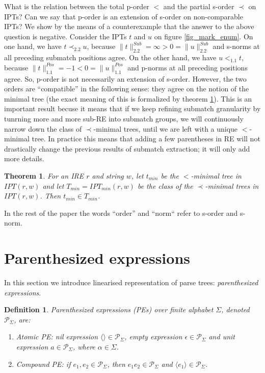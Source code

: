 \documentclass[AMA,STIX1COL]{WileyNJD-v2}
\newcommand{\Xl}{\langle}
\newcommand{\Xr}{\rangle}
\newcommand{\Xm}{\langle\!\rangle}
\newcommand{\XP}{\mathcal{P}}
\newcommand{\IPT}{I\!PT}
\newcommand{\pnorm}[2]{\|{#1}\|^{Pos}_{#2}}
\newcommand{\snorm}[2]{\|{#1}\|^{Sub}_{#2}}
\newtheorem{Xdef}{Definition}
\newtheorem{XThe}{Theorem}
\begin{document}
What is the relation between the total p-order $<$ and the partial s-order $\prec$ on IPTs?
Can we say that p-order is an extension of s-order on non-comparable IPTs?
We show by the means of a counterexample that the answer to the above question is negative.
Consider the IPTs $t$ and $u$ on figure \ref{fig_mark_enum}.
On one hand, we have $t \prec_{2.2} u$, because $\snorm{t}{2.2} = \infty > 0 = \snorm{u}{2.2}$ and s-norms at all preceding submatch positions agree.
On the other hand, we have $u <_{1.1} t$, because $\pnorm{t}{1.1} = -1 < 0 = \pnorm{u}{1.1}$
and p-norms at all preceding positions agree.
So, p-order is not necessarily an extension of s-order.
%
However, the two orders are ``compatible'' in the following sense:
they agree on the notion of the minimal tree (the exact meaning of this is formalized by theorem \ref{theorem_order_compat}).
%
This is an important result becuse it means that
if we keep refining submatch granularity by tunrning more and more sub-RE into submatch groups,
we will continuously narrow down the class of $\prec$-minimal trees,
until we are left with a unique $<$-minimal tree.
In practice this means that adding a few parentheses in RE will not drastically change the previous results of submatch extraction;
it will only add more details.

    \begin{XThe}\label{theorem_order_compat}
    For an IRE $r$ and string $w$,
    let $t_{min}$ be the $<$-minimal tree in $\IPT(r,w)$
    and let $T_{min} = \IPT_{min}(r,w)$ be the class of the $\prec$-minimal trees in $\IPT(r,w)$.
    Then $t_{min} \in T_{min}$.
    \end{XThe}

In the rest of the paper the words ``order'' and ``norm`` refer to s-order and s-norm.

\FloatBarrier

\section{Parenthesized expressions}

In this section we introduce linearised representation of parse trees: \emph{parenthesized expressions}.

    \begin{Xdef}
    \emph{Parenthesized expressions (PEs)} over finite alphabet $\Sigma$, denoted $\XP_\Sigma$, are:
    \begin{enumerate}
        \item Atomic PE:
          \emph{nil expression} $\Xm \in \XP_\Sigma$,
          \emph{empty expression} $\epsilon \in \XP_\Sigma$ and
          \emph{unit expression} $a \in \XP_\Sigma$, where $\alpha \in \Sigma$.
        \item Compound PE: if $e_1, e_2 \in \XP_\Sigma$, then
            $e_1 e_2 \in \XP_\Sigma$ and
            $\Xl e_1 \Xr \in \XP_\Sigma$.
    \end{enumerate}
    \end{Xdef}
\end{document}
